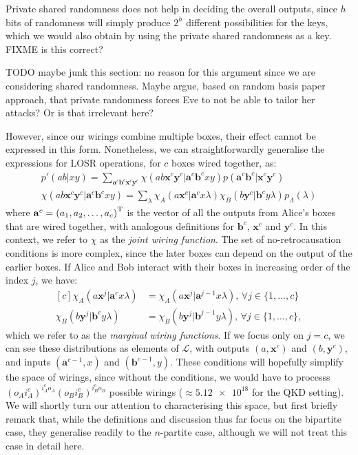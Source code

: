 \documentclass[10pt, a4paper]{article}
\numberwithin{equation}{section} %
\theoremstyle{definition}
\theoremstyle{plain}
\newcommand{\dintv}[2]{\mathopen\{#1,\ldots,#2\mathclose\}}
\newcommand{\?}{\mathrel{?}} %
\newcommand{\cvec}[1]{\boldsymbol{\mathbf{#1}}}    %
\newcommand{\Ls}{\mathcal{L}}
\begin{document}
      Private shared randomness does not help in deciding the overall outputs, since \(h\) bits of randomness will simply produce \(2^h\) different possibilities for the keys, which we would also obtain by using the private shared randomness as a key. FIXME is this correct?

      TODO maybe junk this section: no reason for this argument since we are considering shared randomness. Maybe argue, based on random basis paper approach, that private randomness forces Eve to not be able to tailor her attacks? Or is that irrelevant here?

      However, since our wirings combine multiple boxes, their effect cannot be expressed in this form. Nonetheless, we can straightforwardly generalise the expressions for LOSR operations, for \(c\) boxes wired together, as:
      \begin{gather}
        p'(ab|xy) = \sum_{\cvec{a}^c\cvec{b}^c\cvec{x}^c\cvec{y}^c} \chi(ab\cvec{x}^c\cvec{y}^c|\cvec{a}^c\cvec{b}^cxy) p(\cvec{a}^c\cvec{b}^c|\cvec{x}^c\cvec{y}^c)\label{eqn:wiringprobdef} \\
        \chi(ab\cvec{x}^c\cvec{y}^c|\cvec{a}^c\cvec{b}^cxy) = \sum_{\lambda} \chi_A(a\cvec{x}^c|\cvec{a}^cx \lambda) \chi_B(b\cvec{y}^c|\cvec{b}^cy \lambda) p_{\Lambda}(\lambda)\label{eqn:wiringfndef}
      \end{gather}
      where \(\cvec{a}^c = {(a_1, a_2, \ldots, a_c)}^{\rm T}\) is the vector of all the outputs from Alice's boxes that are wired together, with analogous definitions for \(\cvec{b}^c\), \(\cvec{x}^c\) and \(\cvec{y}^c\). In this context, we refer to \(\chi\) as the \emph{joint wiring function}. The set of no-retrocausation conditions is more complex, since the later boxes can depend on the output of the earlier boxes. If Alice and Bob interact with their boxes in increasing order of the index \(j\), we have:
      \begin{equation}
        \begin{aligned}[c]
        \chi_A(a\cvec{x}^j|\cvec{a}^cx\lambda) &= \chi_A(a\cvec{x}^j|\cvec{a}^{j-1}x\lambda),\,\forall j \in \dintv{1}{c} \\
        \chi_B(b\cvec{y}^j|\cvec{b}^cy\lambda) &= \chi_B(b\cvec{y}^j|\cvec{b}^{j-1}y\lambda),\,\forall j \in \dintv{1}{c},
        \end{aligned}\label{eqn:wiringnoretro}
      \end{equation}
      which we refer to as the \emph{marginal wiring functions}. If we focus only on \(j = c\), we can see these distributions as elements of \(\Ls\), with outputs \((a, \cvec{x}^c)\) and \((b, \cvec{y}^c)\), and inputs \((\cvec{a}^{c-1}, x)\) and \((\cvec{b}^{c-1}, y)\). These conditions will hopefully simplify the space of wirings, since without the conditions, we would have to processs \({(o_A i_A^c)}^{i_A^c o_A} {(o_B i_B^c)}^{i_B^c o_B}\) possible wirings (\(\approx \num{5.12e18}\) for the QKD setting). We will shortly turn our attention to characterising this space, but first briefly remark that, while the definitions and discussion thus far focus on the bipartite case, they generalise readily to the \(n\)-partite case, although we will not treat this case in detail here.
\end{document}
